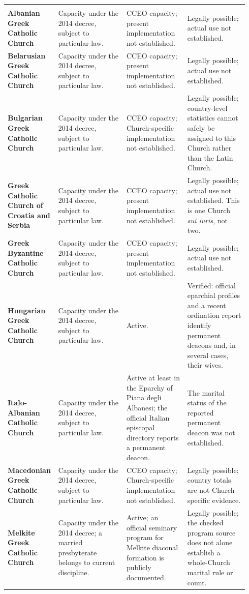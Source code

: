 \begin{landscape}
\begin{longtable}{>{\bfseries\RaggedRight\arraybackslash}p{0.15\linewidth}>{\RaggedRight\arraybackslash}p{0.29\linewidth}>{\RaggedRight\arraybackslash}p{0.25\linewidth}>{\RaggedRight\arraybackslash}p{0.25\linewidth}}
\addlinespace[0.35em]
\multicolumn{4}{l}{\textit{Byzantine tradition}}\\*
Albanian Greek Catholic Church & Capacity under the 2014 decree, subject to particular law. & CCEO capacity; present implementation not established. & Legally possible; actual use not established.\\
Belarusian Greek Catholic Church & Capacity under the 2014 decree, subject to particular law. & CCEO capacity; present implementation not established. & Legally possible; actual use not established.\\
Bulgarian Greek Catholic Church & Capacity under the 2014 decree, subject to particular law. & CCEO capacity; Church-specific implementation not established. & Legally possible; country-level statistics cannot safely be assigned to this Church rather than the Latin Church.\\
Greek Catholic Church of Croatia and Serbia & Capacity under the 2014 decree, subject to particular law. & CCEO capacity; present implementation not established. & Legally possible; actual use not established. This is one Church \emph{sui iuris}, not two.\\
Greek Byzantine Catholic Church & Capacity under the 2014 decree, subject to particular law. & CCEO capacity; present implementation not established. & Legally possible; actual use not established.\\
Hungarian Greek Catholic Church & Capacity under the 2014 decree, subject to particular law. & Active. & Verified: official eparchial profiles and a recent ordination report identify permanent deacons and, in several cases, their wives.\\
Italo-Albanian Catholic Church & Capacity under the 2014 decree, subject to particular law. & Active at least in the Eparchy of Piana degli Albanesi; the official Italian episcopal directory reports a permanent deacon. & The marital status of the reported permanent deacon was not established.\\
Macedonian Greek Catholic Church & Capacity under the 2014 decree, subject to particular law. & CCEO capacity; Church-specific implementation not established. & Legally possible; country totals are not Church-specific evidence.\\
Melkite Greek Catholic Church & Capacity under the 2014 decree; a married presbyterate belongs to current discipline. & Active; an official seminary program for Melkite diaconal formation is publicly documented. & Legally possible; the checked program source does not alone establish a whole-Church marital rule or count.\\

\end{longtable}
\end{landscape}

